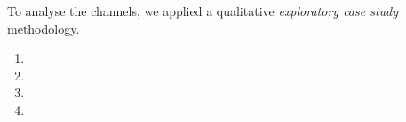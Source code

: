     To analyse the channels, we applied a qualitative \textit{exploratory case study} methodology.


\begin{enumerate}[label=\bfseries{RQ-\arabic*.},itemsep=3pt, topsep=2pt, leftmargin=3em, parsep=0pt]
        \item \rqa
        \item \rqb
        \item \rqc
        \item \rqd
    \end{enumerate}





